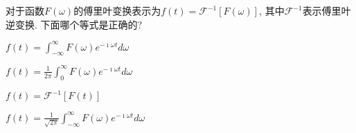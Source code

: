 \documentclass{njustexam}
\begin{document}
\begin{problem}
  对于函数$F(\omega)$的傅里叶变换表示为$f(t) = \mathcal{F}^{-1}[F(\omega)]$, 其中$\mathcal{F}^{-1}$表示傅里叶逆变换. 下面哪个等式是正确的?
  \begin{abcd}
    \item  $f(t) = \int_{-\infty}^{\infty} F(\omega) e^{-\imath\omega t} d\omega$

    \item  $f(t) = \frac{1}{2\pi} \int_{0}^{\infty} F(\omega) e^{-\imath\omega t} d\omega$

    
    \item $f(t) = \mathcal{F}^{-1}[F(t)]$
    
    \item $f(t) = \frac{1}{\sqrt{2\pi}} \int_{-\infty}^{\infty} F(\omega) e^{-\imath\omega t} d\omega$

  \end{abcd}

\end{problem}





\end{document}
